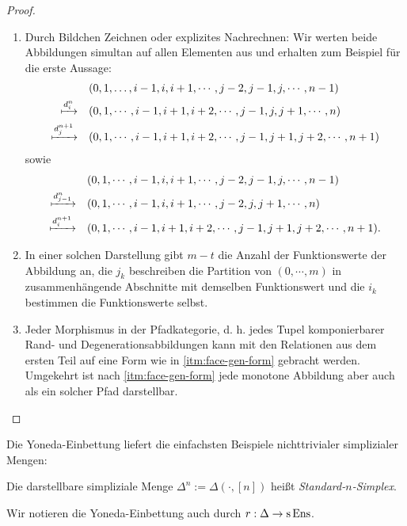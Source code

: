 \begin{proof}
  \begin{enumerate}[label=(\roman*)]
  \item Durch Bildchen Zeichnen oder explizites Nachrechnen: Wir
    werten beide Abbildungen simultan auf allen Elementen aus und
    erhalten zum Beispiel für die erste Aussage:
  \begin{align*}
  &(0, 1, \dots, i-1, i, i+1, \cdots, j-2, j-1, j, \cdots, n-1) \\
  \xmapsto{d_i^n} \quad
  &(0, 1, \cdots, i-1, i+1, i+2, \cdots, j-1, j, j+1, \cdots, n) \\
  \xmapsto{d_j^{n+1}} \quad
  &(0, 1, \cdots, i-1, i+1, i+2, \cdots, j-1, j+1, j+2, \cdots, n+1)
  \end{align*}
  sowie
  \begin{align*}
  &(0, 1, \cdots, i-1, i, i+1, \cdots, j-2, j-1, j, \cdots, n-1) \\
  \xmapsto{d_{j-1}^n} \quad
  &(0, 1, \cdots, i-1, i, i+1, \cdots, j-2, j, j+1, \cdots, n) \\
  \xmapsto{d_i^{n+1}} \quad
  &(0, 1, \cdots, i-1, i+1, i+2, \cdots, j-1, j+1, j+2, \cdots, n+1).
  \end{align*}

  \item In einer solchen Darstellung gibt $m - t$ die Anzahl der
  Funktionswerte der Abbildung an, die $j_k$ beschreiben die Partition
  von $(0, \cdots, m)$ in zusammenhängende Abschnitte mit demselben
  Funktionswert und die $i_k$ bestimmen die Funktionswerte selbst.

  \item Jeder Morphismus in der Pfadkategorie, d. h. jedes Tupel
    komponierbarer Rand- und Degenerationsabbildungen kann mit den
    Relationen aus dem ersten Teil auf eine Form wie in
    \ref{itm:face-gen-form} gebracht werden. Umgekehrt ist nach
    \ref{itm:face-gen-form} jede monotone Abbildung aber auch als ein
    solcher Pfad darstellbar.
\end{enumerate}
\end{proof}

Die Yoneda-Einbettung liefert die einfachsten Beispiele nichttrivialer
simplizialer Mengen:
\begin{defn} \label{def:comb-standard-simplex}
  Die darstellbare simpliziale Menge $\Delta^n := \Delta(\cdot, [n])$
  heißt \emph{Standard-$n$-Simplex}.
\end{defn}
Wir notieren die Yoneda-Einbettung auch durch $r: \Delta \to \operatorname{s}\operatorname{Ens}$.

